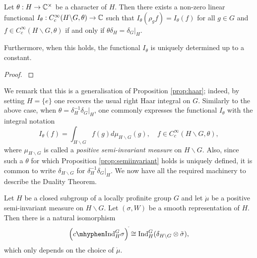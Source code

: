 \begin{prop}\label{prop:semiinvariant}
    Let $\theta:H\to\mathbb{C}^{\times}$ be a character of $H$. Then there exists a non-zero linear functional $I_{\theta}:C_c^{\infty}(H\backslash G,\theta)\to\mathbb{C}$ such that $I_{\theta}(\rho_g f)=I_{\theta}(f)$ for all $g\in G$ and $f\in C_c^{\infty}(H\backslash G,\theta)$ if and only if $\theta\delta_H=\delta_G|_H$.

    Furthermore, when this holds, the functional $I_\theta$ is uniquely determined up to a constant.
\end{prop}
\begin{proof}
    \cite[3.4 Proposition]{BH1}
\end{proof}

We remark that this is a generalisation of Proposition \ref{prop:haar}; indeed, by setting $H=\{e\}$ one recovers the usual right Haar integral on $G$. Similarly to the above case, when $\theta=\delta_H^{-1}\delta_G|_H$, one commonly expresses the functional $I_\theta$ with the integral notation 
$$I_\theta(f)=\int_{H\backslash G}f(g)d\mu_{H\backslash G}(g),\quad f\in C_c^{\infty}(H\backslash G,\theta),$$
where $\mu_{H\backslash G}$ is called a \textit{positive semi-invariant measure} on $H\backslash G$. Also, since such a $\theta$ for which Proposition \ref{prop:semiinvariant} holds is uniquely defined, it is common to write $\delta_{H\backslash G}$ for $\delta_H^{-1}\delta_G|_H$. We now have all the required machinery to describe the Duality Theorem.

\begin{thm}
    Let $H$ be a closed subgroup of a locally profinite group $G$ and let $\dot{\mu}$ be a positive semi-invariant measure on $H\backslash G$. Let $(\sigma,W)$ be a smooth representation of $H$. Then there is a natural isomorphism
    $$\left(\cInd_H^G\sigma \right)^{\check{}}\cong \Ind_H^G(\delta_{H\backslash G}\otimes \check{\sigma}),$$
    which only depends on the choice of $\dot{\mu}$.
\end{thm}

